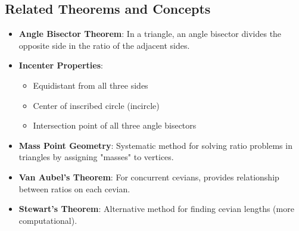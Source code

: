 \documentclass[12pt]{article}
\begin{document}
\subsection*{Related Theorems and Concepts}
\begin{itemize}[leftmargin=*]
    \item \textbf{Angle Bisector Theorem}: In a triangle, an angle bisector divides the opposite side in the ratio of the adjacent sides.
    
    \item \textbf{Incenter Properties}:
    \begin{itemize}
        \item Equidistant from all three sides
        \item Center of inscribed circle (incircle)
        \item Intersection point of all three angle bisectors
    \end{itemize}
    
    \item \textbf{Mass Point Geometry}: Systematic method for solving ratio problems in triangles by assigning "masses" to vertices.
    
    \item \textbf{Van Aubel's Theorem}: For concurrent cevians, provides relationship between ratios on each cevian.
    
    \item \textbf{Stewart's Theorem}: Alternative method for finding cevian lengths (more computational).
\end{itemize}
\end{document}
